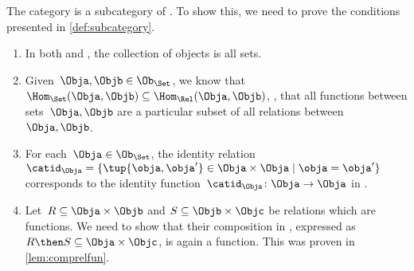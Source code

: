 \begin{example}
  The category \Set is a subcategory of \Rel. To show this, we need to prove the conditions presented in \cref{def:subcategory}.
  \begin{enumerate}
    \item In both \Rel and \Set, the collection of objects is all sets.
    \item Given~$\Obja,\Objb\in \Ob_{\Set}$, we know that~$\Hom_{\Set}(\Obja,\Objb)\subseteq \Hom_{\Rel}(\Obja,\Objb)$, \ie , that all functions between sets~$\Obja,\Objb$ are a particular subset of all relations between~$\Obja,\Objb$.
    \item For each~$\Obja \in \Ob_{\Set}$, the identity relation~$\catid_\Obja=\{\tup{\obja,\obja'}\in \Obja\times \Obja \mid \obja=\obja'\}$ corresponds to the identity function~$\catid_\Obja \colon \Obja \to \Obja$ in \Set.
    \item Let~$R\subseteq \Obja\times \Objb$ and $S\subseteq \Objb \times \Objc$ be relations which are functions. We need to show that their composition in \Rel, expressed as~$R\then S\subseteq \Obja\times \Objc$, is again a function. This was proven in \cref{lem:comprelfun}.
  \end{enumerate}

\end{example}

